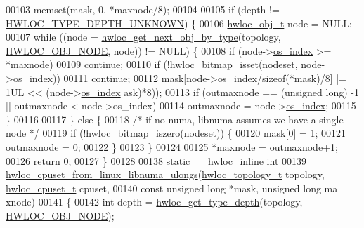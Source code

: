 \begin{DoxyCode}
00103   memset(mask, 0, *maxnode/8);
00104 
00105   \textcolor{keywordflow}{if} (depth != \hyperlink{a00046_ggaf4e663cf42bbe20756b849c6293ef575a0565ab92ab72cb0cec91e23003294aad}{HWLOC_TYPE_DEPTH_UNKNOWN}) \{
00106     \hyperlink{a00016}{hwloc_obj_t} node = NULL;
00107     \textcolor{keywordflow}{while} ((node = \hyperlink{a00053_ga5f08ceb69375341e73563cfe2e77534e}{hwloc_get_next_obj_by_type}(topology, \hyperlink{a00041_ggacd37bb612667dc437d66bfb175a8dc55aaf0964881117bdedf1a5e9332cd120dd}{HWLOC_OBJ_NODE}, node)) !=
       NULL) \{
00108       \textcolor{keywordflow}{if} (node->\hyperlink{a00016_a61a7a80a68eaccbaaa28269e678c81a9}{os_index} >= *maxnode)
00109         \textcolor{keywordflow}{continue};
00110       \textcolor{keywordflow}{if} (!\hyperlink{a00065_ga2583f44cbdb5fff2ea40efdcf3975d3f}{hwloc_bitmap_isset}(nodeset, node->\hyperlink{a00016_a61a7a80a68eaccbaaa28269e678c81a9}{os_index}))
00111         \textcolor{keywordflow}{continue};
00112       mask[node->\hyperlink{a00016_a61a7a80a68eaccbaaa28269e678c81a9}{os_index}/\textcolor{keyword}{sizeof}(*mask)/8] |= 1UL << (node->\hyperlink{a00016_a61a7a80a68eaccbaaa28269e678c81a9}{os_index} %
      ask)*8));
00113       \textcolor{keywordflow}{if} (outmaxnode == (\textcolor{keywordtype}{unsigned} \textcolor{keywordtype}{long}) -1 || outmaxnode < node->os\_index)
00114         outmaxnode = node->\hyperlink{a00016_a61a7a80a68eaccbaaa28269e678c81a9}{os_index};
00115     \}
00116 
00117   \} \textcolor{keywordflow}{else} \{
00118     \textcolor{comment}{/* if no numa, libnuma assumes we have a single node */}
00119     \textcolor{keywordflow}{if} (!\hyperlink{a00065_gaa94fed35d2a598bc4a8657b6955b7bf5}{hwloc_bitmap_iszero}(nodeset)) \{
00120       mask[0] = 1;
00121       outmaxnode = 0;
00122     \}
00123   \}
00124 
00125   *maxnode = outmaxnode+1;
00126   \textcolor{keywordflow}{return} 0;
00127 \}
00128 
00138 \textcolor{keyword}{static} \_\_hwloc\_inline \textcolor{keywordtype}{int}
\hypertarget{a00034_source_l00139}{}\hyperlink{a00068_gafa60816dde33d69149497bcf6c7818e0}{00139} \hyperlink{a00068_gafa60816dde33d69149497bcf6c7818e0}{hwloc_cpuset_from_linux_libnuma_ulongs}(\hyperlink{a00039_ga9d1e76ee15a7dee158b786c30b6a6e38}{hwloc_topology_t} topology, \hyperlink{a00040_ga4bbf39b68b6f568fb92739e7c0ea7801}{hwloc_cpuset_t} 
      cpuset,
00140                                       \textcolor{keyword}{const} \textcolor{keywordtype}{unsigned} \textcolor{keywordtype}{long} *mask, \textcolor{keywordtype}{unsigned} \textcolor{keywordtype}{long} ma
      xnode)
00141 \{
00142   \textcolor{keywordtype}{int} depth = \hyperlink{a00046_gaea7c64dd59467f5201ba87712710b14d}{hwloc_get_type_depth}(topology, \hyperlink{a00041_ggacd37bb612667dc437d66bfb175a8dc55aaf0964881117bdedf1a5e9332cd120dd}{HWLOC_OBJ_NODE});

\end{DoxyCode}
